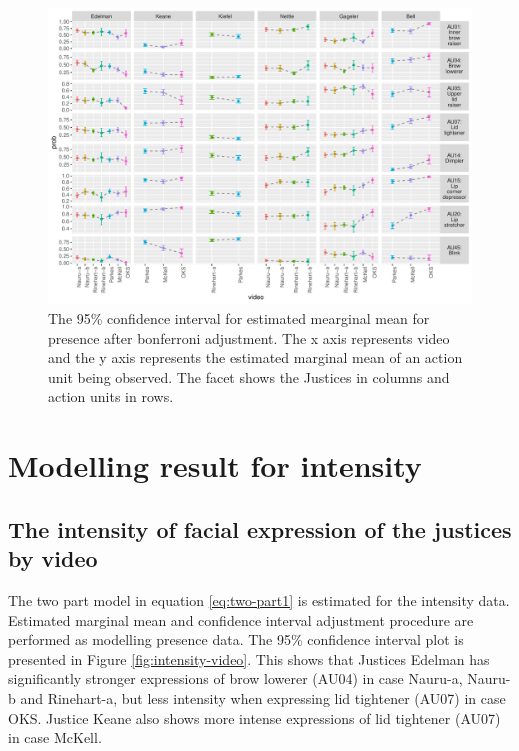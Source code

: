 \documentclass{monashthesis}
\begin{document}
\begin{figure}

{\centering \includegraphics[width=1\linewidth]{figures/model2-plot-1} 

}

\caption{The 95\% confidence interval for estimated mearginal mean for presence after bonferroni adjustment. The x axis represents video and the y axis represents the estimated marginal mean of an action unit being observed. The facet shows the Justices in columns and action units in rows. }\label{fig:model2-plot}
\end{figure}

\hypertarget{modelling-result-for-intensity}{%
\section{Modelling result for intensity}\label{modelling-result-for-intensity}}

\hypertarget{the-intensity-of-facial-expression-of-the-justices-by-video}{%
\subsection{The intensity of facial expression of the justices by video}\label{the-intensity-of-facial-expression-of-the-justices-by-video}}

The two part model in equation \ref{eq:two-part1} is estimated for the intensity data. Estimated marginal mean and confidence interval adjustment procedure are performed as modelling presence data. The 95\% confidence interval plot is presented in Figure \ref{fig:intensity-video}. This shows that Justices Edelman has significantly stronger expressions of brow lowerer (AU04) in case Nauru-a, Nauru-b and Rinehart-a, but less intensity when expressing lid tightener (AU07) in case OKS. Justice Keane also shows more intense expressions of lid tightener (AU07) in case McKell.
\end{document}
